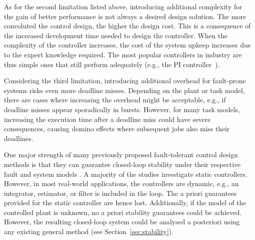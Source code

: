 As for the second limitation listed above, introducing additional complexity for the gain of better performance is not always a desired design solution. 
The more convoluted the control design, the higher the design cost. 
This is a consequence of the increased development time needed to design the controller.
When the complexity of the controller increases, the cost of the system upkeep increases due to the expert knowledge required. 
The most popular controllers in industry are thus simple ones that still perform adequately (e.g., the PI controller~\cite{Sun:2016, Desborough:2002, Astrom:1984}).

%

Considering the third limitation, introducing additional overhead for fault-prone systems risks even more deadline misses. 
Depending on the plant or task model, there are cases where increasing the overhead might be acceptable, e.g., if deadline misses appear sporadically in bursts. 
However, for many task models, increasing the execution time after a deadline miss could have severe consequences, causing domino effects where subsequent jobs also miss their deadlines.

One major strength of many previously proposed fault-tolerant control design methods is that they can guarantee closed-loop stability under their respective fault and system models \cite{Schinkel:2006,Chakraborty:2012,Linsenmayer:2017,Linsenmayer:2020}. 
A majority of the studies investigate static controllers. 
However, in most real-world applications, the controllers are dynamic, e.g., an integrator, estimator, or filter is included in the loop.
The a priori guarantees provided for the static controller are hence lost.
Additionally, if the model of the controlled plant is unknown, no a priori stability guarantees could be achieved.
However, the resulting closed-loop system could be analysed a posteriori using any existing general method (see Section~\ref{sec:stability}).

